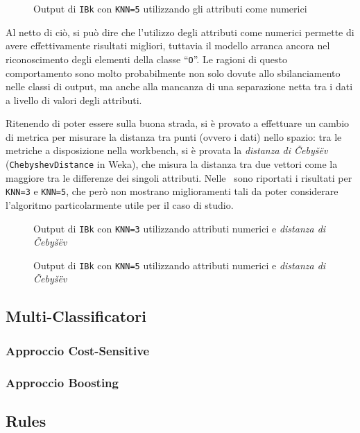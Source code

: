 \begin{figure}[H]
  \centering
  \caption{Output di \texttt{IBk} con \texttt{KNN=5} utilizzando gli attributi come numerici}%
  \label{fig:ibk:5-num}
\end{figure}

Al netto di ciò, si può dire che l'utilizzo degli attributi come numerici permette di avere effettivamente risultati migliori,
tuttavia il modello arranca ancora nel riconoscimento degli elementi della classe ``\texttt{O}''.
Le ragioni di questo comportamento sono molto probabilmente non solo dovute allo sbilanciamento nelle classi di output,
ma anche alla mancanza di una separazione netta tra i dati a livello di valori degli attributi.

Ritenendo di poter essere sulla buona strada, si è provato a effettuare un cambio di metrica per misurare la distanza tra punti (ovvero i dati) nello spazio:
tra le metriche a disposizione nella workbench, si è provata la \emph{distanza di Čebyšëv} (\texttt{ChebyshevDistance} in Weka), che misura la distanza tra due vettori come la maggiore tra le differenze dei singoli attributi.
Nelle~ sono riportati i risultati per \texttt{KNN=3} e \texttt{KNN=5}, che però non mostrano miglioramenti tali da poter considerare l'algoritmo particolarmente utile per il caso di studio.

\begin{figure}[H]
  \centering
  \caption{Output di \texttt{IBk} con \texttt{KNN=3} utilizzando attributi numerici e \emph{distanza di Čebyšëv}}%
  \label{fig:ibk:3-num-che}
\end{figure}

\begin{figure}[H]
  \centering
  \caption{Output di \texttt{IBk} con \texttt{KNN=5} utilizzando attributi numerici e \emph{distanza di Čebyšëv}}%
  \label{fig:ibk:5-num-che}
\end{figure}

\subsection{Multi-Classificatori}

\subsubsection{Approccio Cost-Sensitive}

\subsubsection{Approccio Boosting}

\subsection{Rules}
